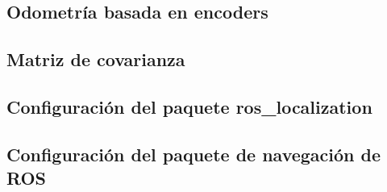 \subsection{Odometría basada en encoders}

\subsection{Matriz de covarianza}

\subsection{Configuración del paquete ros\_localization}

\subsection{Configuración del paquete de navegación de ROS}
 
